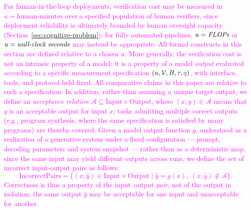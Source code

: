 \documentclass[11pt]{article}
\newcommand{\rev}[1]{\textcolor{magenta}{#1}}
\newcommand{\viola}[1]{\textcolor[HTML]{7030A0}{#1}}
\newcommand{\rev}[1]{#1}
\newcommand{\viola}[1]{#1}
\begin{document}
\rev{For human-in-the-loop deployments, verification cost may be measured in $u=\text{human-minutes}$ over a specified population of human verifiers, since deployment reliability is ultimately bounded by human oversight capacity (Section~\ref{sec:cognitive-problem}); for fully automated pipelines, $u=\emph{FLOPs}$ or $u=\emph{wall-clock seconds}$ may instead be appropriate. All formal constructs in this section are defined relative to a chosen $u$.}
\rev{More generally, the verification cost is not an intrinsic property of a model: it is a property of a model \emph{output} evaluated according to a specific measurement specification $(u,\mathcal{V},B,\tau,\viola{q})$, with interface, tools, and protocol held fixed. All comparative claims in this paper are relative to such a specification.}
\rev{In addition, rather than assuming a unique target output, we define an \emph{acceptance relation} $\mathcal{A} \subseteq \text{Input} \times \text{Output}$, where $(x,y)\in\mathcal{A}$ means that $y$ is an acceptable output for input $x$; tasks admitting multiple correct outputs (e.g., program synthesis, where the same specification is satisfied by many programs) are thereby covered. Given a model output function \viola{$g$, understood as a realization of a generative system under a fixed configuration --- prompt, decoding parameters and system snapshot --- rather than as a deterministic map, since the same input may yield different outputs across runs}, we define the set of incorrect input-output pairs as follows:}
\rev{
\[
\mathrm{IncorrectPairs}
=
\{(x,\hat{y}) \in \text{Input} \times \text{Output} \mid \hat{y}=g(x),\ (x,\hat{y})\notin\mathcal{A}\}.
\]
}
\rev{Correctness is thus a property of the input--output \emph{pair}, not of the output in isolation: the same output $\hat{y}$ may be acceptable for one input and unacceptable for another.}
\end{document}
